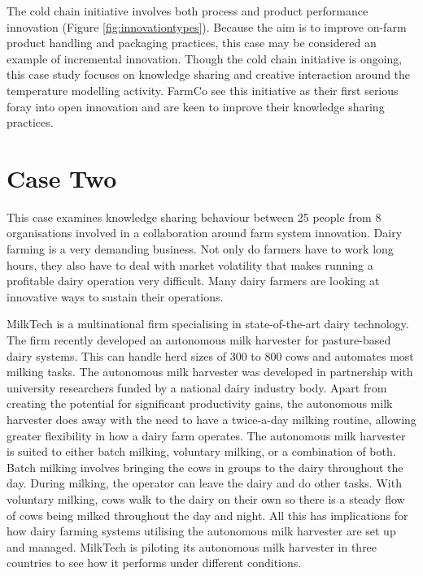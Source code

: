 The cold chain initiative involves both process and product performance innovation (Figure \ref{fig:innovationtypes}). Because the aim is to improve on-farm product handling and packaging practices, this case may be considered an example of incremental innovation. Though the cold chain initiative is ongoing, this case study focuses on knowledge sharing and creative interaction around the temperature modelling activity. FarmCo see this initiative as their first serious foray into open innovation and are keen to improve their knowledge sharing practices.\medskip

\section{Case Two}

This case examines knowledge sharing behaviour between 25 people from 8 organisations involved in a collaboration around farm system innovation. Dairy farming is a very demanding business. Not only do farmers have to work long hours, they also have to deal with market volatility that makes running a profitable dairy operation very difficult. Many dairy farmers are looking at innovative ways to sustain their operations.\medskip

MilkTech is a multinational firm specialising in state-of-the-art dairy technology. The firm recently developed an autonomous milk harvester for pasture-based dairy systems. This can handle herd sizes of 300 to 800 cows and automates most milking tasks. The autonomous milk harvester was developed in partnership with university researchers funded by a national dairy industry body. Apart from creating the potential for significant productivity gains, the autonomous milk harvester does away with the need to have a twice-a-day milking routine, allowing greater flexibility in how a dairy farm operates. The autonomous milk harvester is suited to either batch milking, voluntary milking, or a combination of both. Batch milking involves bringing the cows in groups to the dairy throughout the day. During milking, the operator can leave the dairy and do other tasks. With voluntary milking, cows walk to the dairy on their own so there is a steady flow of cows being milked throughout the day and night. All this has implications for how dairy farming systems utilising the autonomous milk harvester are set up and managed. MilkTech is piloting its autonomous milk harvester in three countries to see how it performs under different conditions. \medskip

